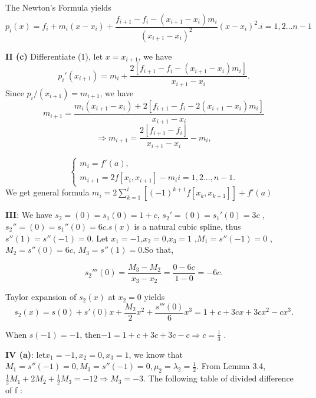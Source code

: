 \documentclass{article}
\begin{document}
The Newton's Formula yields
\begin{equation}
    p_i(x) = f_i + m_i(x-x_i) + \frac{f_{i+1} - f_i -(x_{i+1} - x_i)m_i}{(x_{i+1} - x _ i)^2}(x-x_i)^2.  i = 1,2...n-1
\end{equation}

\textbf{II (c)}
Differentiate (1), let $x=x_{i+1}$, we have
\begin{equation*}
    p_i'(x_{i+1})= m_i + \frac{2[f_{i+1} - f_i -(x_{i+1} - x_i)m_i]}{x_{i+1}-x_i}.
\end{equation*}
Since $p_i/(x_{i+1}) = m_{i+1}$, we have
\begin{equation*}
    m_{i+1}= \frac{m_i(x_{i+1}-x_i) + 2[f_{i+1} - f_i -2(x_{i+1} - x_i)m_i]}{x_{i+1}-x_i} 
\end{equation*}
\begin{equation*}
    \Rightarrow m_{i+1}= \frac{2[f_{i+1} - f_i]}{x_{i+1}-x_i} - m_i,   
\end{equation*}

\begin{equation*}
    \begin{cases}
        m_i = f'(a) , \\
        m_{i+1} = 2f[x_i,x_{i+1}] - m_i i=1,2...,n-1.
    \end{cases}
\end{equation*}
We get general formula $m_i = 2\sum_{k=1}^i[(-1)^{k+1}f[x_k,x_{k+1}]] + f'(a)$

\textbf{III}: We have $s_2=(0)=s_1(0)=1+c$, $s_2'=(0)=s_1'(0)=3c$ , $s_2''=(0)=s_1''(0)=6c$.$s(x)$ is a natural cubic spline, thus$s''(1)=s''(-1)=0$.
Let $x_1=-1$,$x_2=0$,$x_3=1$ ,$M_1=s''(-1)=0$ ,$M_2=s''(0)=6c$, $M_3=s''(1)=0$.So that,

\begin{equation*}
    s_2'''(0) = \frac{M_3 - M_2}{x_3 - x_2} = \frac{0 - 6c}{1 - 0} = -6c.
\end{equation*}

Taylor expansion of $s_2(x)$ at $x_2=0$ yields
\begin{equation*}
    s_2(x) = s(0) + s'(0)x +\frac{M_2}{2}x^2 + \frac{s'''(0)}{6}x^3 = 1 + c + 3cx + 3cx^2 - cx^3.
\end{equation*}

When $s(-1)=-1$, then$ -1 = 1 + c + 3c + 3c - c \Rightarrow c = \frac{1}{3}$ . 

\textbf{IV (a)}: let$x_1 = -1, x_2 = 0 , x_3 = 1$, we know that $M_1 = s''(-1) = 0 , M_3 = s''(-1) = 0 , \mu_2 = \lambda_2 = \frac{1}{2}.$
From Lemma 3.4, $\frac{1}{2}M_1 + 2M_2 + \frac{1}{2}M_3 = -12 \Rightarrow M_3 = -3$.
\newline
The following table of divided difference of f :
\end{document}
